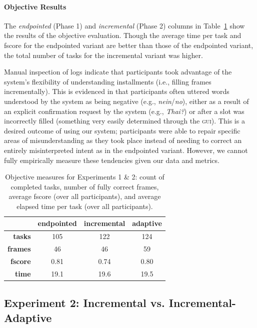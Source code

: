 \documentclass[11pt]{article}
\newcommand{\ui}[0]{\textsc{gui}}
\begin{document}
\paragraph{Objective Results}  The \emph{endpointed} (Phase 1) and \emph{incremental} (Phase 2) columns in Table~\ref{tab:objscores} show the results of the objective evaluation. Though the average time per task and fscore for the endpointed variant are better than those of the endpointed variant, the total number of tasks for the incremental variant was higher. 

Manual inspection of logs indicate that participants took advantage of the system's flexibility of understanding installments (i.e., filling frames incrementally). This is evidenced in that participants often uttered words understood by the system as being negative (e.g., \emph{nein}/\emph{no}), either as a result of an explicit confirmation request by the system (e.g., \emph{Thai?}) or after a slot was incorrectly filled (something very easily determined through the \ui). This is a desired outcome of using our system; participants were able to repair specific areas of misunderstanding as they took place instead of needing to correct an entirely misinterpreted intent as in the endpointed variant. However, we cannot fully empirically measure these tendencies given our data and metrics. 

\begin{table}
 \begin{tabular}{|r|c|c|c|}
\hline
                     & \textbf{endpointed} & \textbf{incremental} & \textbf{adaptive} \\
\hline
\textbf{tasks} & 105 & 122 & 124  \\
\textbf{frames} & 46 & 46 & 59 \\
\textbf{fscore} & 0.81 & 0.74 & 0.80 \\
\textbf{time} & 19.1 & 19.6 & 19.5 \\
 \hline
\end{tabular}
\caption{Objective measures for Experiments 1 \& 2: count of completed tasks, number of fully correct frames, average fscore (over all participants), and average elapsed time per task (over all participants).}
\label{tab:objscores}
\end{table}

\subsection{Experiment 2: Incremental vs. Incremental-Adaptive}
\label{section:exp2}
\end{document}
